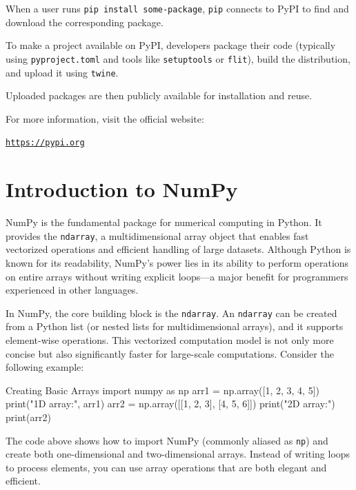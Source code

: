 When a user runs \texttt{pip install some-package}, \texttt{pip} connects to PyPI to find and download the corresponding package.

To make a project available on PyPI, developers package their code (typically using \texttt{pyproject.toml} and tools like \texttt{setuptools} or \texttt{flit}), build the distribution, and upload it using \texttt{twine}.

Uploaded packages are then publicly available for installation and reuse.

For more information, visit the official website:

\href{https://pypi.org}{\texttt{https://pypi.org}}



%
\section{Introduction to NumPy}

NumPy is the fundamental package for numerical computing in Python. It provides the \texttt{ndarray}, a multidimensional array object that enables fast vectorized operations and efficient handling of large datasets. Although Python is known for its readability, NumPy’s power lies in its ability to perform operations on entire arrays without writing explicit loops—a major benefit for programmers experienced in other languages.

In NumPy, the core building block is the \texttt{ndarray}. An \texttt{ndarray} can be created from a Python list (or nested lists for multidimensional arrays), and it supports element-wise operations. This vectorized computation model is not only more concise but also significantly faster for large-scale computations. Consider the following example:

\begin{codeonly}{Creating Basic Arrays}
import numpy as np
arr1 = np.array([1, 2, 3, 4, 5])
print("1D array:", arr1)
arr2 = np.array([[1, 2, 3], [4, 5, 6]])
print("2D array:")
print(arr2)
\end{codeonly}

The code above shows how to import NumPy (commonly aliased as \texttt{np}) and create both one-dimensional and two-dimensional arrays. Instead of writing loops to process elements, you can use array operations that are both elegant and efficient.

